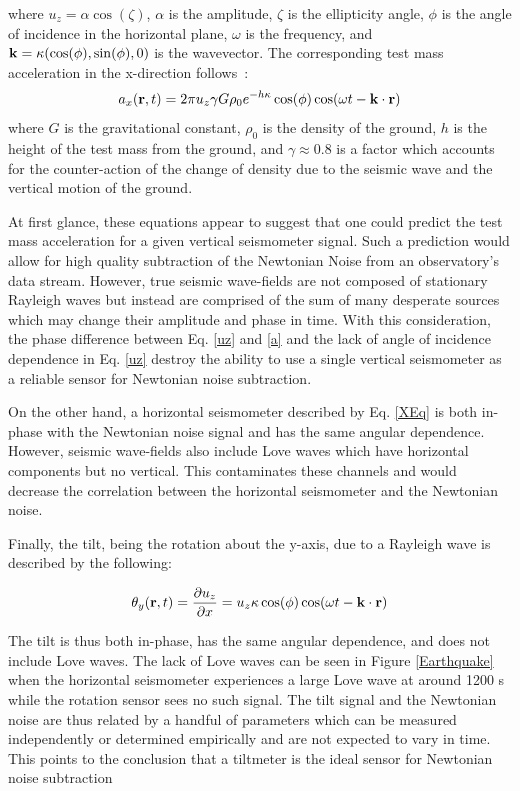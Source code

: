 \documentclass [12pt, proquest]{uwthesis}[2019]
\begin{document}
where $u_z=\alpha \cos(\zeta)$, $\alpha$ is the amplitude, $\zeta$ is the ellipticity angle, $\phi$ is the angle of incidence in the horizontal plane, $\omega$ is the frequency, and $\bf{k}=\kappa (\cos(\phi),\sin(\phi),\text{0})$ is the wavevector. The corresponding test mass acceleration in the x-direction follows~\cite{Harms_2016}:
\begin{equation}
a_x({\bf r} ,t)=2 \pi u_z \gamma G \rho_0 e^{-h \kappa}  \cos(\phi) \cos(\omega t-{\bf k}\cdot{\bf r}) \label{a}
\end{equation}
where $G$ is the gravitational constant, $\rho_0$ is the density of the ground, $h$ is the height of the test mass from the ground, and $\gamma \approx 0.8$ is a factor which accounts for the counter-action of the change of density due to the seismic wave and the vertical motion of the ground.

At first glance, these equations appear to suggest that one could predict the test mass acceleration for a given vertical seismometer signal. Such a prediction would allow for high quality subtraction of the Newtonian Noise from an observatory's data stream. However, true seismic wave-fields are not composed of stationary Rayleigh waves but instead are comprised of the sum of many desperate sources which may change their amplitude and phase in time. With this consideration, the phase difference between Eq. \ref{uz} and \ref{a} and the lack of angle of incidence dependence in Eq. \ref{uz} destroy the ability to use a single vertical seismometer as a reliable sensor for Newtonian noise subtraction.

On the other hand, a horizontal seismometer described by Eq. \ref{XEq} is both in-phase with the Newtonian noise signal and has the same angular dependence. However, seismic wave-fields also include Love waves which have horizontal components but no vertical. This contaminates these channels and would decrease the correlation between the horizontal seismometer and the Newtonian noise. 

Finally, the tilt, being the rotation about the y-axis, due to a Rayleigh wave is described by the following:

\begin{equation}
\theta_y({\bf r} ,t)=\frac{\partial u_z}{\partial x}=u_z \kappa \cos(\phi) \cos(\omega t-{\bf k}\cdot{\bf r})\label{tX}\\
\end{equation}

The tilt is thus both in-phase, has the same angular dependence, and does not include Love waves. The lack of Love waves can be seen in Figure \ref{Earthquake} when the horizontal seismometer experiences a large Love wave at around 1200 s while the rotation sensor sees no such signal. The tilt signal and the Newtonian noise are thus related by a handful of parameters which can be measured independently or determined empirically and are not expected to vary in time. This points to the conclusion that a tiltmeter is the ideal sensor for Newtonian noise subtraction
\end{document}
